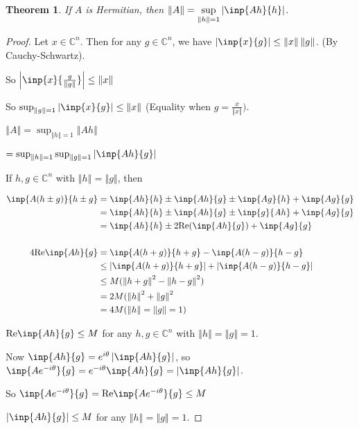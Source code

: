 \documentclass[twofold]{article}
\newcommand*\norm[1]{\left \Vert #1 \right\Vert}
\newcommand*\abs[1]{\left \vert #1 \right\vert}
\theoremstyle{plain}
\newtheorem{theorem}{Theorem}
\theoremstyle{definition}
\theoremstyle{remark}
\begin{document}
\begin{theorem}\label{norm_herm} If \(A\) is Hermitian, then \(\norm{A} =\displaystyle \sup_{\norm{h} = 1} \abs{\inp{Ah}{h}}\).\end{theorem}
\begin{proof} Let \(x \in \mathbb{C}^n\). Then for any \(g \in \mathbb{C}^n\), we have \(\abs{\inp{x}{g}} \le \norm{x} \norm{g}\). (By Cauchy-Schwartz).

So \(\abs{\inp{x}{\frac{g}{\norm{g}}}} \le \norm{x}\) 

So \(\sup_{\norm{g} = 1} \abs{\inp{x}{g}} \le \norm{x} \) (Equality when \(g = \frac{x}{\norm{x}})\).

\(\norm{A} = \sup_{\norm{h} = 1} \norm{Ah}\)

\(= \sup_{\norm{h} = 1} \sup_{\norm{g}=1} \abs{\inp{Ah}{g}}  \)

If \(h, g \in \mathbb{C}^n\) with \(\norm{h} = \norm{g}\), then

\begin{equation*} \begin{split}
\inp{A (h \pm g)}{h\pm g} & = \inp{Ah}{h} \pm \inp{Ah}{g} \pm \inp{Ag}{h} + \inp{Ag}{g} \\
& = \inp{Ah}{h} \pm \inp{Ah}{g} \pm \inp{g}{Ah} + \inp{Ag}{g} \\
& = \inp{Ah}{h} \pm 2 \text{Re}(\inp{Ah}{g}) + \inp{Ag}{g} \\ \\
4 \text{Re}\inp{Ah}{g} &= \inp{A(h+g)}{h+g} - \inp{A(h-g)}{h-g} \\
& \le \abs{\inp{A(h+g)}{h+g}} + \abs{\inp{A(h-g)}{h-g}} \\
& \le M (\norm{h + g}^2 - \norm{h-g}^2) \\
& = 2M (\norm{h}^2 + \norm{g}^2 \\
& = 4M (\norm{h} = \norm{g} = 1) 
\end{split} \end{equation*}

\(\text{Re} \inp{Ah}{g} \le M\) for any \(h, g \in \mathbb{C}^n\) with \(\norm{h} = \norm{g} = 1\). 

Now \(\inp{Ah}{g} = e^{i \theta} \abs{\inp{Ah}{g}}\), so \(\inp{A e^{- i\theta}}{g} = e^{-i \theta} \inp{Ah}{g} = \abs{\inp{Ah}{g}}\).

So \(\inp{Ae^{-i\theta}}{g} =  \text{Re} \inp{Ae^{-i\theta}}{g} \le M\)

\(\abs{\inp{Ah}{g}} \le M\) for any \(\norm{h} = \norm{g} = 1\).
\end{proof}
\end{document}
